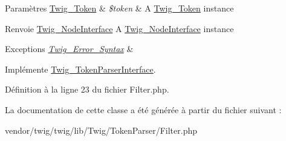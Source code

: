\begin{DoxyParams}[1]{Paramètres}
\hyperlink{class_twig___token}{Twig\+\_\+\+Token} & {\em \$token} & A \hyperlink{class_twig___token}{Twig\+\_\+\+Token} instance\\
\hline
\end{DoxyParams}
\begin{DoxyReturn}{Renvoie}
\hyperlink{interface_twig___node_interface}{Twig\+\_\+\+Node\+Interface} A \hyperlink{interface_twig___node_interface}{Twig\+\_\+\+Node\+Interface} instance
\end{DoxyReturn}

\begin{DoxyExceptions}{Exceptions}
{\em \hyperlink{class_twig___error___syntax}{Twig\+\_\+\+Error\+\_\+\+Syntax}} & \\
\hline
\end{DoxyExceptions}


Implémente \hyperlink{interface_twig___token_parser_interface_a5dfa2e269321584fb74e8b43dabe0efd}{Twig\+\_\+\+Token\+Parser\+Interface}.



Définition à la ligne 23 du fichier Filter.\+php.



La documentation de cette classe a été générée à partir du fichier suivant \+:\begin{DoxyCompactItemize}
\item 
vendor/twig/twig/lib/\+Twig/\+Token\+Parser/Filter.\+php\end{DoxyCompactItemize}
